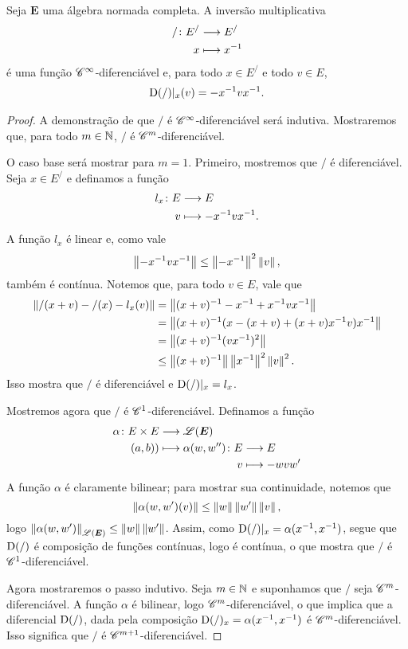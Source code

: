 \begin{proposition}
Seja $\bm E$ uma álgebra normada completa. A inversão multiplicativa
	\begin{align*}
	{/}\colon {E^{/}} &\longrightarrow {E^{/}} \\{x} &\longmapsto x^{-1}
	\end{align*}
é uma função $\mathscr{C}^\infty$-diferenciável e, para todo $x \in E^{/}$ e todo $v \in E$,
	\begin{align*}
	\mathrm{D}(/)|_x(v) = -x^{-1} v x^{-1}.
	\end{align*}
\end{proposition}
\begin{proof}
A demonstração de que $/$ é $\mathscr{C}^\infty$-diferenciável será indutiva. Mostraremos que, para todo $m \in \mathbb{N}$, $/$ é $\mathscr{C}^m$-diferenciável.

O caso base será mostrar para $m=1$. Primeiro, mostremos que $/$ é diferenciável. Seja $x \in E^{/}$ e definamos a função
	\begin{align*}
	{l_x}\colon {E} &\longrightarrow {E} \\{v} &\longmapsto -x^{-1} v x^{-1}.
	\end{align*}
A função $l_x$ é linear e, como vale
	\begin{equation}
	\left\Vert{-x^{-1}v x^{-1}}\right\Vert \leq \left\Vert{-x^{-1}}\right\Vert^2 \left\Vert{v}\right\Vert,
	\end{equation}
também é contínua. Notemos que, para todo $v \in E$, vale que
	\begin{align*}
	\left\Vert{/(x+v) - /(x) - l_x(v)}\right\Vert &= \left\Vert{(x+v)^{-1}- x^{-1}+ x^{-1}v x^{-1}}\right\Vert \\
		&= \left\Vert{(x+v)^{-1}(x-(x+v)+(x+v)x^{-1}v )x^{-1}}\right\Vert \\
		&=\left\Vert{(x+v)^{-1}(vx^{-1})^2}\right\Vert \\
		&\leq \left\Vert{(x+v)^{-1}}\right\Vert \left\Vert{x^{-1}}\right\Vert^2 \left\Vert{v}\right\Vert^2.
	\end{align*}
Isso mostra que $/$ é diferenciável e $\mathrm{D}(/)|_x = l_x$.

Mostremos agora que $/$ é $\mathscr{C}^1$-diferenciável. Definamos a função
	\begin{align*}
	\func{\alpha}{E \times E}{\toplin(\bm E)}{(a,b))}{
		\begin{aligned}[t]
			\func{\alpha(w,w'')}{E}{E}{v}{-wvw'}
		\end{aligned}
		}
	\end{align*}
A função $\alpha$ é claramente bilinear; para mostrar sua continuidade, notemos que
	\begin{equation*}
	\left\Vert{\alpha(w,w')(v)}\right\Vert \leq \left\Vert{w}\right\Vert\left\Vert{w'}\right\Vert\left\Vert{v}\right\Vert,
	\end{equation*}
logo $\left\Vert{\alpha(w,w')}\right\Vert_{\mathscr{L}(\bm E)} \leq \left\Vert{w}\right\Vert\left\Vert{w'}\right\Vert$. Assim, como $\mathrm{D}(/)|_x = \alpha(x^{-1},x^{-1})$, segue que $\mathrm{D}(/)$ é composição de funções contínuas, logo é contínua, o que mostra que $/$ é $\mathscr{C}^1$-diferenciável.

Agora mostraremos o passo indutivo. Seja $m \in \mathbb{N}$ e suponhamos que $/$ seja $\mathscr{C}^m$-diferenciável. A função $\alpha$ é bilinear, logo $\mathscr{C}^m$-diferenciável, o que implica que a diferencial $\mathrm{D}(/)$, dada pela composição $\mathrm{D}(/)_x = \alpha(x^{-1}, x^{-1})$ é $\mathscr{C}^m$-diferenciável. Isso significa que $/$ é $\mathscr{C}^{m+1}$-diferenciável.
\end{proof}

